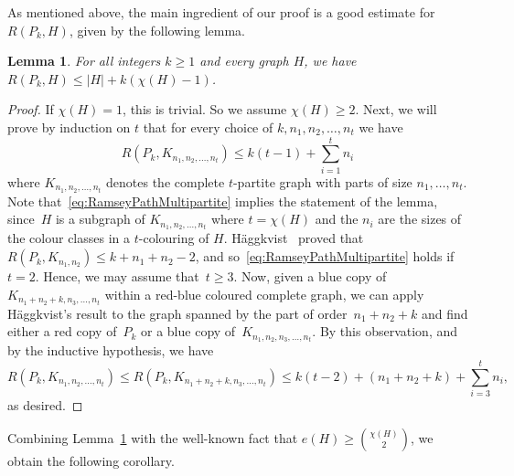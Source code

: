 \documentclass{article}
\newtheorem{lemma}[theorem]{Lemma}
\newtheorem{claim}[theorem]{Claim}
\newcommand{\kp}[1]{\textcolor{teal}{\textbf{[KP: } #1\textbf{]}}}
\newcommand{\scc}[1]{\textcolor{red}{\textbf{[SC: } #1\textbf{]}}}
\begin{document}
As mentioned above, the main ingredient of our proof is a good estimate for $R(P_k,H)$, given by the following lemma.
\begin{lemma}
\label{lemma:ramsey_of_path_vs_any}
For all integers $k \geq 1$ and every graph $H$, we have $R(P_k, H) \leq |H| + k (\chi(H)-1)$.
\end{lemma}
\begin{proof}
    If $\chi(H)=1$, this is trivial. So we assume $\chi(H) \ge 2.$
    Next, we will prove by induction on $t$ that for every choice of $k,n_1,n_2, \ldots, n_t$ we have
    \begin{equation}\label{eq:RamseyPathMultipartite}
        R(P_k, K_{n_1, n_2, \ldots, n_t}) \le k(t-1)+ \sum_{i=1}^t n_i
    \end{equation}
    where $K_{n_1, n_2, \ldots, n_t}$ denotes the complete $t$-partite graph with parts of size $n_1,\dots,n_t$.
    Note that~\eqref{eq:RamseyPathMultipartite} implies the statement of the lemma, since~$H$ is a subgraph of $K_{n_1, n_2, \ldots, n_t}$ where $t= \chi(H)$ and the $n_i$ are the sizes of the colour classes in a $t$-colouring of $H$.
   H\"aggkvist~\cite{Haggkvist89} proved that $R(P_k, K_{n_1, n_2})\le k+n_1+n_2-2$, and so~\eqref{eq:RamseyPathMultipartite} holds if~$t=2$.
   Hence, we may assume that~$t\ge3$.
   Now, given a blue copy of~$K_{n_1+n_2+k, n_3, \ldots, n_t}$ within a red-blue coloured complete graph,
   we can apply H\"aggkvist's result to the graph spanned by the part of order~$n_1+n_2+k$ and find either a red copy of~$P_k$ or a blue copy of~$K_{n_1,n_2, n_3, \ldots, n_t}$.
   By this observation, and by the inductive hypothesis, we have
   $$R(P_k, K_{n_1, n_2, \ldots, n_t}) \le R(P_k, K_{n_1+n_2+k, n_3, \ldots, n_t})\le k(t-2)+(n_1+n_2+k)+\sum_{i=3}^t n_i,$$
   as desired.
\end{proof}

Combining Lemma~\ref{lemma:ramsey_of_path_vs_any} with the well-known fact that $e(H) \ge \binom{\chi(H)}{2} $, we obtain the following corollary.
\end{document}

